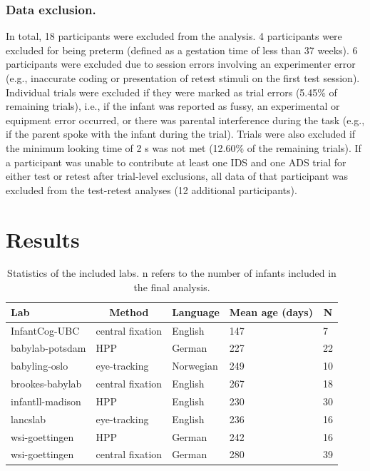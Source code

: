 \documentclass[
  man,floatsintext]{apa6}
\begin{document}
\hypertarget{data-exclusion.}{%
\subsubsection{Data exclusion.}\label{data-exclusion.}}

In total, 18 participants were excluded from the analysis.
4 participants were excluded for being preterm (defined as a gestation time of less than 37 weeks).
6 participants were excluded due to session errors involving an experimenter error (e.g., inaccurate coding or presentation of retest stimuli on the first test session).
Individual trials were excluded if they were marked as trial errors (5.45\% of remaining trials), i.e., if the infant was reported as fussy, an experimental or equipment error occurred, or there was parental interference during the task (e.g., if the parent spoke with the infant during the trial).
Trials were also excluded if the minimum looking time of 2 s was not met (12.60\% of the remaining trials).
If a participant was unable to contribute at least one IDS and one ADS trial for either test or retest after trial-level exclusions, all data of that participant was excluded from the test-retest analyses (12 additional participants).

\hypertarget{results}{%
\section{Results}\label{results}}

\begin{table}[tbp]

\begin{center}
\begin{threeparttable}

\caption{\label{tab:labs}Statistics of the included labs. n refers to the number of infants included in the final analysis.}

\begin{tabular}{lllll}
\toprule
Lab & \multicolumn{1}{c}{Method} & \multicolumn{1}{c}{Language} & \multicolumn{1}{c}{Mean age (days)} & \multicolumn{1}{c}{N}\\
\midrule
InfantCog-UBC & central fixation & English & 147 & 7\\
babylab-potsdam & HPP & German & 227 & 22\\
babyling-oslo & eye-tracking & Norwegian & 249 & 10\\
brookes-babylab & central fixation & English & 267 & 18\\
infantll-madison & HPP & English & 230 & 30\\
lancslab & eye-tracking & English & 236 & 16\\
wsi-goettingen & HPP & German & 242 & 16\\
wsi-goettingen & central fixation & German & 280 & 39\\
\bottomrule
\end{tabular}

\end{threeparttable}
\end{center}

\end{table}
\end{document}
